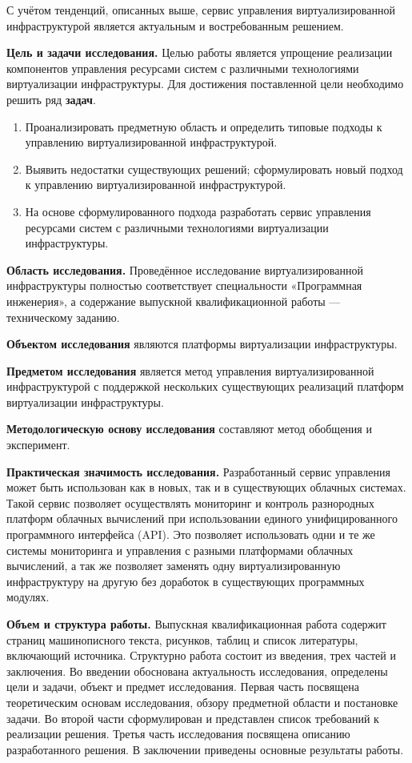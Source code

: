 С учётом тенденций, описанных выше, сервис управления виртуализированной инфраструктурой является актуальным и востребованным решением.

\textbf{Цель и задачи исследования.}
Целью работы является упрощение реализации компонентов управления ресурсами систем с различными технологиями виртуализации инфраструктуры.
Для достижения поставленной цели необходимо решить ряд \textbf{задач}.
\begin{enumerate}
    \item Проанализировать предметную область и определить типовые подходы к управлению виртуализированной инфраструктурой.
    \item Выявить недостатки существующих решений; сформулировать новый подход к управлению виртуализированной инфраструктурой.
    \item На основе сформулированного подхода разработать сервис управления ресурсами систем с различными технологиями виртуализации инфраструктуры.
\end{enumerate}

\textbf{Область исследования.}
Проведённое исследование виртуализированной инфраструктуры полностью соответствует специальности «Программная инженерия», а содержание выпускной квалификационной работы --- техническому заданию.

\textbf{Объектом исследования} являются платформы виртуализации инфраструктуры.

\textbf{Предметом исследования} является метод управления виртуализированной инфраструктурой с поддержкой нескольких существующих реализаций платформ виртуализации инфраструктуры.


\textbf{Методологическую основу исследования} составляют метод обобщения и эксперимент.

\textbf{Практическая значимость исследования.} Разработанный сервис управления может быть использован как в новых, так и в существующих облачных системах.
Такой сервис позволяет осуществлять мониторинг и контроль разнородных платформ облачных вычислений при использовании единого унифицированного программного интерфейса (API).
Это позволяет использовать одни и те же системы мониторинга и управления с разными платформами облачных вычислений, а так же позволяет заменять одну виртуализированную инфраструктуру на другую без доработок в существующих программных модулях.

\textbf{Объем и структура работы.}
Выпускная квалификационная работа содержит  страниц машинописного текста,  рисунков,  таблиц и список литературы, включающий  источника. 
Структурно работа состоит из введения, трех частей и заключения. 
Во введении обоснована актуальность исследования, определены цели и задачи, объект и предмет исследования. 
Первая часть посвящена теоретическим основам исследования, обзору предметной области и постановке задачи. 
Во второй части сформулирован и представлен список требований к реализации решения.
Третья часть исследования посвящена описанию разработанного решения.
В заключении приведены основные результаты работы.